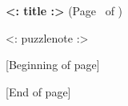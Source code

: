 % 
\usepackage{lastpage}




\begin{center}
  \textbf{<: title :>} (Page \thepage\ of \pageref{LastPage})

  \medskip

  <: puzzlenote :>

  \bigskip

  [Beginning of page]


  [End of page]

\end{center}



